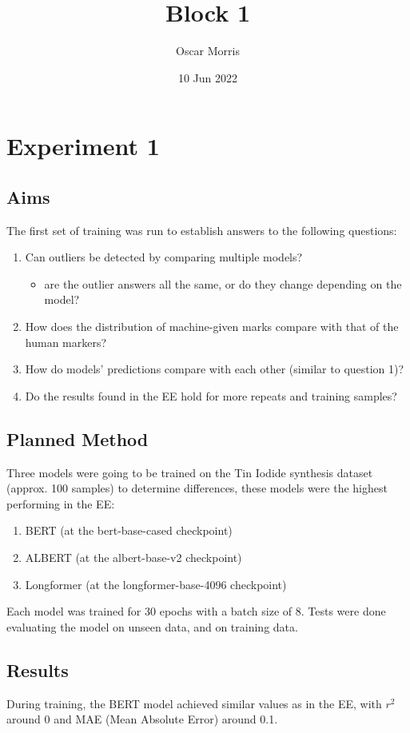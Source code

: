 \documentclass[11pt]{article}
\author{Oscar Morris}
\date{10 Jun 2022}
\title{Block 1}
\begin{document}
\maketitle


\section{Experiment 1}
\label{sec:orgd2693b3}
\subsection{Aims}
\label{sec:org01d9086}
The first set of training was run to establish answers to the following questions:
\begin{enumerate}
\item Can outliers be detected by comparing multiple models?
\begin{itemize}
\item are the outlier answers all the same, or do they change depending on the model?
\end{itemize}
\item How does the distribution of machine-given marks compare with that of the human markers?
\item How do models' predictions compare with each other (similar to question 1)?
\item Do the results found in the EE hold for more repeats and training samples?
\end{enumerate}

\subsection{Planned Method}
\label{sec:org2c78348}
Three models were going to be trained on the Tin Iodide synthesis dataset (approx. 100 samples) to determine differences, these models were the highest performing in the EE:
\begin{enumerate}
\item BERT (at the bert-base-cased checkpoint)
\item ALBERT (at the albert-base-v2 checkpoint)
\item Longformer (at the longformer-base-4096 checkpoint)
\end{enumerate}

Each model was trained for 30 epochs with a batch size of 8. Tests were done evaluating the model on unseen data, and on training data.

\subsection{Results}
\label{sec:orgcc34ad2}
During training, the BERT model achieved similar values as in the EE, with \(r^2\) around \(0\) and MAE (Mean Absolute Error) around 0.1.
\end{document}
